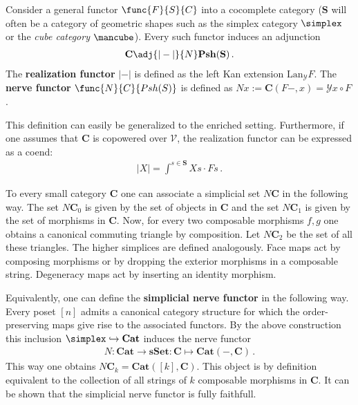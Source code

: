     \begin{construct}\label{model:nerve_and_realization}
        Consider a general functor $\func{F}{S}{C}$ into a cocomplete category ($\mathbf{S}$ will often be a category of geometric shapes such as the simplex category $\simplex$ or the \textit{cube category} $\mbox{\mancube}$). Every such functor induces an adjunction
        \begin{gather}
            \mathbf{C}\adj{|-|}{N}\mathbf{Psh}(\mathbf{S})\,.
        \end{gather}
        The \textbf{realization functor} $|-|$ is defined as the left Kan extension $\mathrm{Lan}_{\mathcal{Y}}F$. The \textbf{nerve functor} $\func{N}{C}{Psh(S)}$ is defined as $Nx:=\mathbf{C}(F-,x)=\mathcal{Y}x\circ F$.

        This definition can easily be generalized to the enriched setting. Furthermore, if one assumes that $\mathbf{C}$ is copowered over $\mathcal{V}$, the realization functor can be expressed as a coend:
        \begin{gather}
            |X| = \int^{s\in\mathbf{S}}Xs\cdot Fs\,.
        \end{gather}
    \end{construct}

    \begin{example}\label{model:nerve}
        To every small category \textbf{C} one can associate a simplicial set $N\mathbf{C}$ in the following way. The set $N\mathbf{C}_0$ is given by the set of objects in $\mathbf{C}$ and the set $N\mathbf{C}_1$ is given by the set of morphisms in $\mathbf{C}$. Now, for every two composable morphisms $f,g$ one obtains a canonical commuting triangle by composition. Let $N\mathbf{C}_2$ be the set of all these triangles. The higher simplices are defined analogously. Face maps act by composing morphisms or by dropping the exterior morphisms in a composable string. Degeneracy maps act by inserting an identity morphism.

        Equivalently, one can define the \textbf{simplicial nerve functor} in the following way. Every poset $[n]$ admits a canonical category structure for which the order-preserving maps give rise to the associated functors. By the above construction this inclusion $\simplex\hookrightarrow\mathbf{Cat}$ induces the nerve functor
        \begin{gather}
            N:\mathbf{Cat}\rightarrow\mathbf{sSet}:\mathbf{C}\mapsto\mathbf{Cat}(-,\mathbf{C})\,.
        \end{gather}
        This way one obtains $N\mathbf{C}_k=\mathbf{Cat}([k], \mathbf{C})$. This object is by definition equivalent to the collection of all strings of $k$ composable morphisms in $\mathbf{C}$. It can be shown that the simplicial nerve functor is fully faithfull.
    \end{example}

